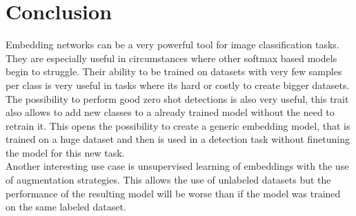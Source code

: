 \documentclass[12pt,a4paper]{report}
\begin{document}
\chapter{Conclusion}

Embedding networks can be a very powerful tool for image classification tasks.
They are especially useful in circumstances where other softmax based models begin to struggle.
Their ability to be trained on datasets with very few samples per class is very useful in tasks where its hard or costly to create bigger datasets.
The possibility to perform good zero shot detections is also very useful, this trait also allows to add new classes to a already trained model without the need to retrain it.
This opens the possibility to create a generic embedding model, that is trained on a huge dataset and then is used in a detection task without finetuning the model for this new task.
\\
Another interesting use case is unsupervised learning of embeddings with the use of augmentation strategies.
This allows the use of unlabeled datasets but the performance of the resulting model will be worse than if the model was trained on the same labeled dataset.




\end{document}
